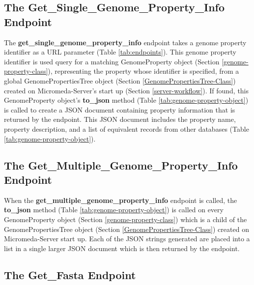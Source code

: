 \subsection{The Get\_Single\_Genome\_Property\_Info Endpoint}

The \textbf{get\_single\_genome\_property\_info} endpoint takes a genome property identifier as a URL parameter (Table \ref{tab:endpoints}). This genome property identifier is used query for a matching GenomeProperty object (Section \ref{genome-property-class}), representing the property whose identifier is specified, from a global GenomePropertiesTree object (Section \ref{GenomePropertiesTree-Class}) created on Micromeda-Server's start up (Section \ref{server-workflow}). If found, this GenomeProperty object's \textbf{to\_json} method (Table \ref{tab:genome-property-object}) is called to create a JSON document containing property information that is returned by the endpoint. This JSON document includes the property name, property description, and a list of equivalent records from other databases (Table \ref{tab:genome-property-object}).

\subsection{The Get\_Multiple\_Genome\_Property\_Info Endpoint}

When the \textbf{get\_multiple\_genome\_property\_info} endpoint is called, the \textbf{to\_json} method (Table \ref{tab:genome-property-object}) is called on every GenomeProperty object (Section \ref{genome-property-class}) which is a child of the GenomePropertiesTree object (Section \ref{GenomePropertiesTree-Class}) created on Micromeda-Server start up. Each of the JSON strings generated are placed into a list in a single larger JSON document which is then returned by the endpoint. 

\subsection{The Get\_Fasta Endpoint} \label{get-fasta-endpoint}

